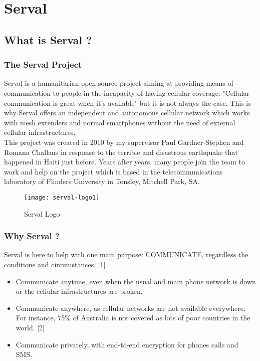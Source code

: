 \chapter{Serval}

\section{What is Serval ?}

\subsection{The Serval Project}
Serval is a humanitarian open source project aiming at providing means of communication to people in the incapacity of having cellular coverage. "Cellular communication is great when it's available" but it is not always the case. This is why Serval offers an independent and autonomous cellular network which works with mesh extenders and normal smartphones without the need of external cellular infrastructures. \\
This project was created in 2010 by my supervisor Paul Gardner-Stephen and Romana Challans in response to the terrible and disastrous earthquake that happened in Haiti just before. Years after years, many people join the team to work and help on the project which is based in the telecommunications laboratory of Flinders University in Tonsley, Mitchell Park, SA.

\begin{figure}[h]
\centering
\texttt{[image: serval-logo1]}
\caption{Serval Logo}
\end{figure}

\subsection{Why Serval ?}
Serval is here to help with one main purpose: COMMUNICATE, regardless the conditions and circumstances. [1]
\begin{itemize}
\item Communicate anytime, even when the usual and main phone network is down or the cellular infrastructures are broken.
\item Communicate anywhere, as cellular networks are not available everywhere. For instance, 75\% of Australia is not covered as lots of poor countries in the world. [2] 
\item Communicate privately, with end-to-end encryption for phones calls and SMS.
\end{itemize}


